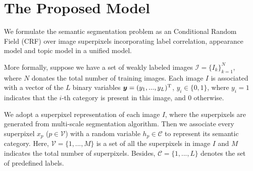 
\section{The Proposed Model}
We formulate the semantic segmentation problem as an Conditional Random Field (CRF) over image superpixels incorporating label correlation, appearance model and topic model in a unified model.

More formally, suppose we have a set of weakly labeled images $\mathcal{I}=\{I_k\}_{k=1}^N$, where $N$ donates the total number of training images. Each image $I$ is associated with a vector of the $L$ binary variables $\boldsymbol{y} = (y_1,...,y_L)^{\rm T}$, \ie $y_i \in \{0,1\}$, where $y_i=1$ indicates that the $i$-th category is present in this image, and $0$ otherwise.

We adopt a superpixel representation of each image $I$, where the superpixels are generated from multi-scale segmentation algorithm. Then we associate every superpixel $x_p$ ($p \in \mathcal{V}$) with a random variable $h_p \in \mathcal{C}$ to represent its semantic category. Here, $\mathcal{V} = \{1,...,M\}$ is a set of all the superpixels in image $I$ and $M$ indicates the total number of superpixels. Besides, $\mathcal{C} = \{1,...,L\}$ denotes the set of predefined labels. 

